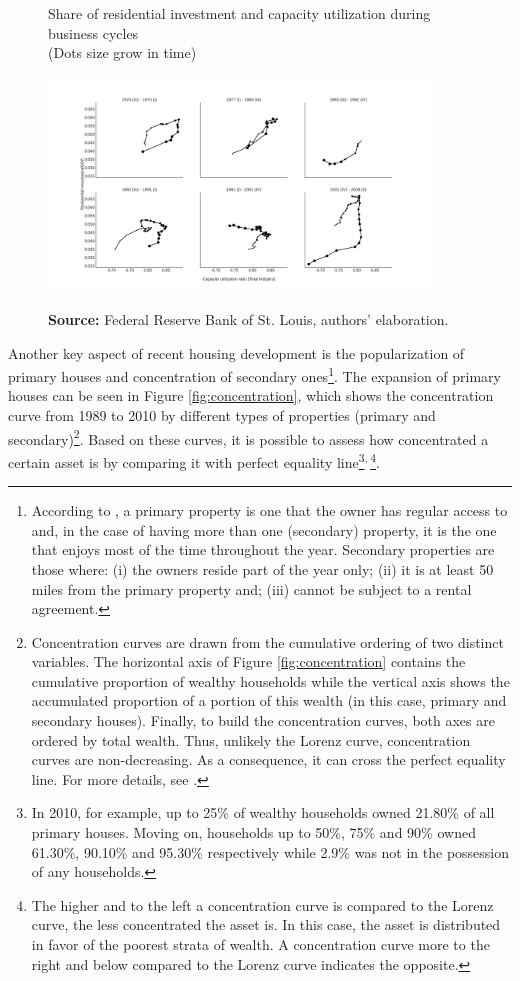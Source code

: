 \documentclass[11pt]{article}
\begin{document}
\begin{figure}[htb]
    \centering
        \caption{Share of residential investment and capacity utilization during business cycles\\\centering (Dots size grow in  time)} 
    \includegraphics[width = 0.9\textwidth]{./figs/cycles.png}
    \label{fig:cycles}
    \caption*{\textbf{Source:} Federal Reserve Bank of St. Louis, authors’ elaboration.}
\end{figure}
Another key aspect of recent housing development is the  popularization of primary houses and concentration of secondary ones\footnote{According to \textcite{us_census_bureau_characteristics_2017}, a primary property is one that the owner has regular access to and, in the case of having more than one (secondary) property, it is the one that enjoys most of the time throughout the year. Secondary properties are those where:
(i) the owners reside part of the year only; (ii) it is at least 50 miles from the primary property and; (iii) cannot be subject to a rental agreement.}. The expansion of primary houses can be seen in Figure \ref{fig:concentration}, which shows the concentration curve from 1989 to 2010 by different types of properties (primary and secondary)\footnote{Concentration curves are drawn from the cumulative ordering of two distinct variables. The horizontal axis of Figure \ref{fig:concentration} contains the cumulative proportion of wealthy households while the vertical axis shows the accumulated proportion of a portion of this wealth (in this case, primary and secondary houses). Finally, to build the concentration curves, both axes are ordered by total wealth. Thus, unlikely the Lorenz curve, concentration curves are non-decreasing. As a consequence, it can cross the perfect equality line. For more details, see \textcite{Jann_Concentration_2016}.}. Based on these curves, it is possible to assess how concentrated a certain asset is by comparing it with perfect equality line\footnote{In 2010, for example,  up to 25\% of wealthy households owned 21.80\% of all primary houses. Moving on, households up to 50\%, 75\% and 90\% owned 61.30\%, 90.10\% and  95.30\% respectively while 2.9\% was not in the possession of any households.}\textsuperscript{,}\,\footnote{The higher and to the left a concentration curve is compared to the Lorenz curve, the less concentrated the asset is. In this case, the asset  is distributed in favor of the poorest strata of wealth. A concentration curve more to the right and below compared to the Lorenz curve indicates the opposite.}.
\end{document}
